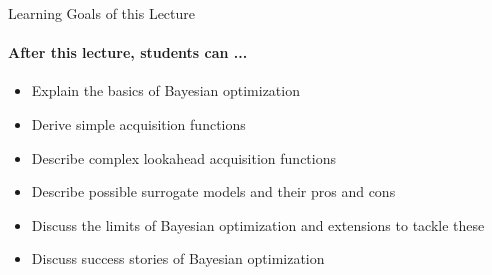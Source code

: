 \begin{frame}[c]{Learning Goals of this Lecture}
\framesubtitle{After this lecture, students can ...}

\begin{itemize}
    \item Explain the basics of Bayesian optimization
    \item Derive \alert{simple acquisition functions}
    \item Describe \alert{complex lookahead acquisition functions}
    \item Describe possible \alert{surrogate models} and their pros and cons 
    \item Discuss the \alert{limits of Bayesian optimization} and extensions to tackle these
    \item Discuss \alert{success stories} of Bayesian optimization
\end{itemize}

\end{frame}

%


